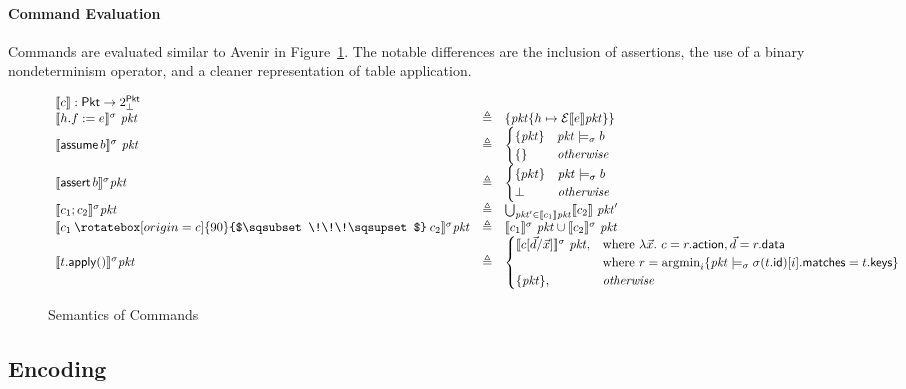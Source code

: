 \documentclass{article}
\newcommand{\pkt}{\mathit{pkt}}
\newcommand{\denote}[1]{\llbracket#1\rrbracket}
\newcommand{\edenote}[1]{\mathcal{E}\denote{#1}}
\newcommand{\Pkt}{\mathsf{Pkt}}
\newcommand{\matches}{\mathsf{matches}}
\newcommand{\action}{\mathsf{action}}
\newcommand{\keys}{\mathsf{keys}}
\newcommand{\data}{\mathsf{data}}
\newcommand{\id}{\mathsf{id}}
\newcommand{\assert}{\mathop{\mathsf{assert}}}
\newcommand{\assume}{\mathop{\mathsf{assume}}}
\newcommand{\apply}{\mathsf{apply}}
\newcommand{\choice}{\mathbin{\rotatebox[origin=c]{90}{$\sqsubset\!\!\!\sqsupset$}}}
\newcommand{\argmin}{\mathop{\textrm{argmin}}}
\begin{document}
\paragraph{Command Evaluation}
Commands are evaluated similar to Avenir in Figure~\ref{fig:com-sem}. The
notable differences are the inclusion of assertions, the use of a binary
nondeterminism operator, and a cleaner representation of table application.

\begin{figure}[htp]
  \[\begin{array}{l >{\triangleq}cl}
  \multicolumn{3}{l}{\denote{c} : \Pkt \to 2^\Pkt_\bot }\\
    \denote{h.f := e}^\sigma~\pkt && \{\pkt\{h \mapsto \edenote{e}\pkt\}\} \\
    \denote{\assume b}^\sigma~\pkt &&
    \begin{cases}
      \{\pkt\} & \pkt \models_\sigma b \\
      \{\} & \textit{otherwise} \\
    \end{cases}\\
    \denote{\assert b}^\sigma \pkt &&
    \begin{cases}
      \{pkt\} & \pkt \models_\sigma b \\
      \bot & \textit{otherwise}
    \end{cases} \\
    \denote{c_1;c_2}^\sigma \pkt&&
    \bigcup_{\pkt' \in \denote{c_1}\pkt}\denote{c_2}~\pkt' \\
    \denote{c_1 \choice c_2}^\sigma \pkt &&
    \denote{c_1}^\sigma~\pkt \cup \denote{c_2}^\sigma~\pkt \\
    \denote{t.\apply()}^\sigma \pkt &&
    \begin{cases}
      \denote{c[\vec d/\vec x]}^\sigma~\pkt,
      & \text{where}~\lambda \vec x.~c = r.\action, \vec d = r.\data \\
      & \text{where}~r = \argmin_i\{\pkt \models_\sigma \sigma(t.\id)[i].\matches = t.\keys \} \\

      \{\pkt\}, & \mathit{otherwise}
    \end{cases}

  \end{array}\]
  \caption{Semantics of Commands}
  \label{fig:com-sem}
\end{figure}


\subsection{Encoding}
\end{document}
